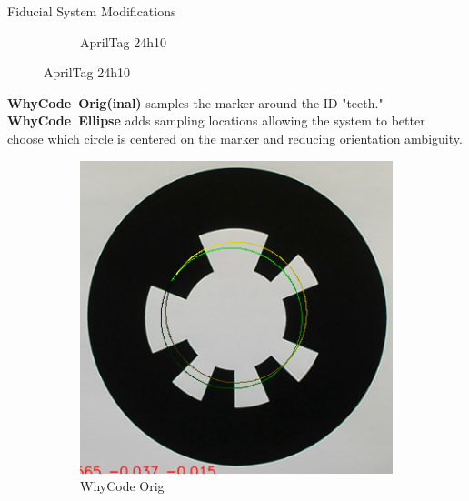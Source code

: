 \documentclass[final, 20pt]{beamer}
\newlength{\colwidth}
\begin{document}
\begin{frame}[t]
\begin{columns}[t]
\begin{column}{\colwidth}
\begin{block}{Fiducial System Modifications}
\begin{figure}[]
\begin{subfigure}[b]{0.25\linewidth}
            \caption{AprilTag 24h10}
            \label{figure:apriltag24h10}
        \end{subfigure}
        \label{figure:marker_setup}
    \end{figure}
    \vspace*{-1.75cm}
    \textbf{WhyCode~Orig(inal)} samples the marker around the ID "teeth."
    \textbf{WhyCode~Ellipse} adds sampling locations allowing the system to better choose which circle is centered on the marker
    and reducing orientation ambiguity.

    \begin{figure}[]
        \centering
        \begin{subfigure}[b]{0.3\linewidth}
            \includegraphics[width=\textwidth]{./images/whycode_orig_both_solutions_cropped}
            \caption{WhyCode Orig}
            \label{figure:whycode_orig}
        \end{subfigure}
        \begin{subfigure}[b]{0.3\linewidth}

\end{subfigure}
\end{figure}
\end{block}
\end{column}
\end{columns}
\end{frame}
\end{document}
